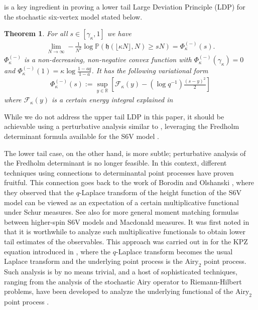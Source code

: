 \documentclass[reqno,11pt]{amsart}
\newcommand{\h}{\mathfrak{h}}
\renewcommand{\Pr}{\mathbb{P}}
\newcommand{\lln}{\gamma_\kappa}
\numberwithin{equation}{section}
\newtheorem{theorem}[proposition]{Theorem}
\theoremstyle{definition}
\newcommand{\R}{\mathbb{R}}
\begin{document}
 is a key ingredient in proving a lower tail Large Deviation Principle (LDP) for the stochastic six-vertex model stated below.

\begin{theorem}\label{thm.main} For all $s\in [\lln,1]$ we have
    \begin{align}\label{e.main}
        \lim_{N\to \infty}-\frac1{N^2}\log\Pr(\h(\lfloor \kappa N \rfloor,N) \ge sN) = \Phi_\kappa^{(-)}(s).
    \end{align}
    $\Phi_\kappa^{(-)}$ is a non-decreasing, non-negative convex function with $\Phi_\kappa^{(-)}(\lln)=0$ and $\Phi_\kappa^{(-)}(1)=\kappa \log\frac{1-aq}{1-a}$. It has the following variational form
    \begin{align}\label{defphi}
        \Phi_\kappa^{(-)}(s):=\sup_{y\in \R} \left[\mathcal{F}_\kappa(y)-(\log q^{-1})\frac{(s-y)^2}{2}\right]
    \end{align}
    where $\mathcal{F}_\kappa(y)$ is a certain energy integral explained in 
\end{theorem}


While we do not address the upper tail LDP in this paper, it should be achievable using a perturbative analysis similar to \cite{dt21,lin2020kpz,dz1,das2023large}, leveraging the Fredholm determinant formula available for the S6V model \cite{borodin2016stochastic_MM,BO2016_ASEP}.

The lower tail case, on the other hand, is more subtle; perturbative analysis of the Fredholm determinant is no longer feasible. In this context, different techniques using connections to determinantal point processes have proven fruitful. This connection goes back to the work of Borodin and Olshanski \cite{BO2016_ASEP}, where they observed that the $q$-Laplace transform of the height function of the S6V model can be viewed as an expectation of a certain multiplicative functional under Schur measures. See also \cite{borodin2016stochastic_MM} for more general moment matching formulas between higher-spin S6V models and Macdonald measures.
It was first noted in \cite{lwtail} that it is worthwhile to analyze such multiplicative functionals to obtain lower tail estimates of the observables. This approach was carried out in \cite{lwtail} for the KPZ equation introduced in \cite{KPZ1986}, where the $q$-Laplace transform becomes the usual Laplace transform and the underlying point process is the $\mathrm{Airy}_2$ point process. Such analysis is by no means trivial, and a host of sophisticated techniques, ranging from the analysis of the stochastic Airy operator to Riemann-Hilbert problems, have been developed to analyze the underlying functional of the $\mathrm{Airy}_2$ point process \cite{tsai_lower_tail,cafasso_claeys_KPZ}.
\end{document}
